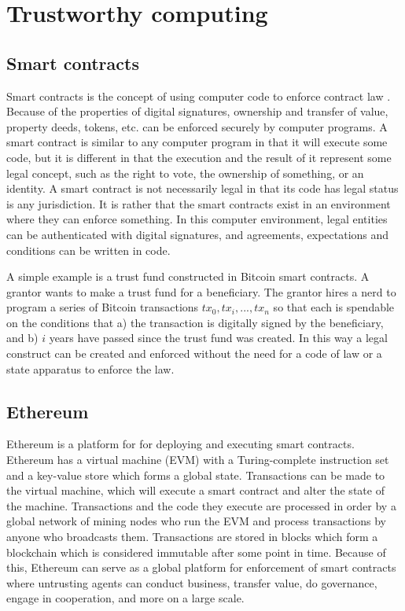 \section{Trustworthy computing}
\label{sec:trustworthy}

\subsection{Smart contracts}

Smart contracts is the concept of using computer code to enforce contract law \cite{szabo1997smartcontracts}. Because of the properties of digital signatures, ownership and transfer of value, property deeds, tokens, etc. can be enforced securely by computer programs. A smart contract is similar to any computer program in that it will execute some code, but it is different in that the execution and the result of it represent some legal concept, such as the right to vote, the ownership of something, or an identity.  A smart contract is not necessarily legal in that its code has legal status is any jurisdiction. It is rather that the smart contracts exist in an environment where they can enforce something. In this computer environment, legal entities can be authenticated with digital signatures, and agreements, expectations and conditions can be written in code.

A simple example is a trust fund constructed in Bitcoin smart contracts. A grantor wants to make a trust fund for a beneficiary. The grantor hires a nerd to program a series of Bitcoin transactions ${tx_0, tx_i, ..., tx_n}$ so that each is spendable on the conditions that a) the transaction is digitally signed by the beneficiary, and b) $i$ years have passed since the trust fund was created. In this way a legal construct can be created and enforced without the need for a code of law or a state apparatus to enforce the law.

\subsection{Ethereum}

Ethereum \cite{wood2018ethereum} is a platform for for deploying and executing smart contracts. Ethereum has a virtual machine (EVM) with a Turing-complete instruction set and a key-value store which forms a global state. Transactions can be made to the virtual machine, which will execute a smart contract and alter the state of the machine. Transactions and the code they execute are processed in order by a global network of mining nodes who run the EVM and process transactions by anyone who broadcasts them. Transactions are stored in blocks which form a blockchain which is considered immutable after some point in time. Because of this, Ethereum can serve as a global platform for enforcement of smart contracts where untrusting agents can conduct business, transfer value, do governance, engage in cooperation, and more on a large scale.

